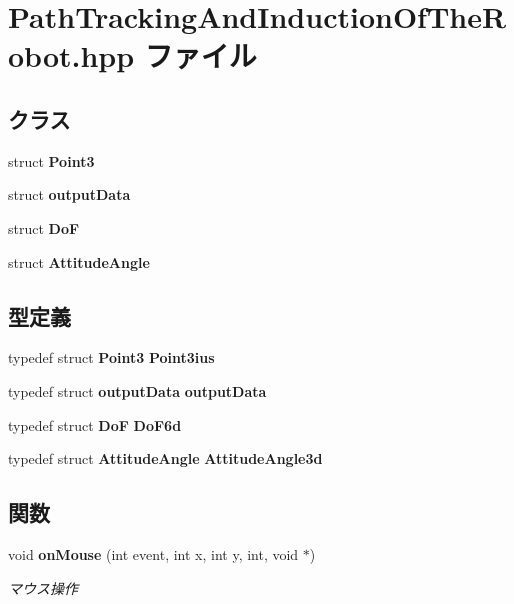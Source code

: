 \section{Path\-Tracking\-And\-Induction\-Of\-The\-Robot.\-hpp ファイル}
\label{_path_tracking_and_induction_of_the_robot_8hpp}
\subsection*{クラス}
\begin{DoxyCompactItemize}
\item 
struct {\bf Point3}
\item 
struct {\bf output\-Data}
\item 
struct {\bf Do\-F}
\item 
struct {\bf Attitude\-Angle}
\end{DoxyCompactItemize}
\subsection*{型定義}
\begin{DoxyCompactItemize}
\item 
typedef struct {\bf Point3} {\bf Point3ius}
\item 
typedef struct {\bf output\-Data} {\bf output\-Data}
\item 
typedef struct {\bf Do\-F} {\bf Do\-F6d}
\item 
typedef struct {\bf Attitude\-Angle} {\bf Attitude\-Angle3d}
\end{DoxyCompactItemize}
\subsection*{関数}
\begin{DoxyCompactItemize}
\item 
void {\bf on\-Mouse} (int event, int x, int y, int, void $\ast$)
\begin{DoxyCompactList}\small\item\em マウス操作 \end{DoxyCompactList}\end{DoxyCompactItemize}
